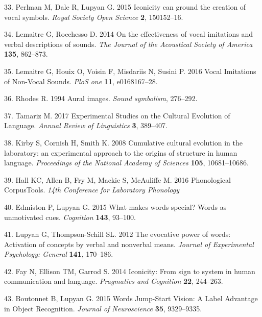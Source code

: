 \documentclass[english,floatsintext,man]{apa6}
\theoremstyle{definition}
\theoremstyle{definition}
\theoremstyle{definition}
\theoremstyle{remark}
\begin{document}
\leavevmode\hypertarget{ref-Perlman:2015ip}{}%
33. Perlman M, Dale R, Lupyan G. 2015 Iconicity can ground the creation
of vocal symbols. \emph{Royal Society Open Science} \textbf{2},
150152--16.

\leavevmode\hypertarget{ref-Lemaitre:2014kr}{}%
34. Lemaitre G, Rocchesso D. 2014 On the effectiveness of vocal
imitations and verbal descriptions of sounds. \emph{The Journal of the
Acoustical Society of America} \textbf{135}, 862--873.

\leavevmode\hypertarget{ref-Lemaitre:2016kz}{}%
35. Lemaitre G, Houix O, Voisin F, Misdariis N, Susini P. 2016 Vocal
Imitations of Non-Vocal Sounds. \emph{PloS one} \textbf{11},
e0168167--28.

\leavevmode\hypertarget{ref-Rhodes:1994au}{}%
36. Rhodes R. 1994 Aural images. \emph{Sound symbolism}, 276--292.

\leavevmode\hypertarget{ref-Tamariz:2017bd}{}%
37. Tamariz M. 2017 Experimental Studies on the Cultural Evolution of
Language. \emph{Annual Review of Linguistics} \textbf{3}, 389--407.

\leavevmode\hypertarget{ref-Kirby:2008kja}{}%
38. Kirby S, Cornish H, Smith K. 2008 Cumulative cultural evolution in
the laboratory: an experimental approach to the origins of structure in
human language. \emph{Proceedings of the National Academy of Sciences}
\textbf{105}, 10681--10686.

\leavevmode\hypertarget{ref-PCT:1.1}{}%
39. Hall KC, Allen B, Fry M, Mackie S, McAuliffe M. 2016 Phonological
CorpusTools. \emph{14th Conference for Laboratory Phonology}

\leavevmode\hypertarget{ref-Edmiston:2015he}{}%
40. Edmiston P, Lupyan G. 2015 What makes words special? Words as
unmotivated cues. \emph{Cognition} \textbf{143}, 93--100.

\leavevmode\hypertarget{ref-Lupyan:2012cp}{}%
41. Lupyan G, Thompson-Schill SL. 2012 The evocative power of words:
Activation of concepts by verbal and nonverbal means. \emph{Journal of
Experimental Psychology: General} \textbf{141}, 170--186.

\leavevmode\hypertarget{ref-Fay:2014ih}{}%
42. Fay N, Ellison TM, Garrod S. 2014 Iconicity: From sign to system in
human communication and language. \emph{Pragmatics and Cognition}
\textbf{22}, 244--263.

\leavevmode\hypertarget{ref-Boutonnet:2015fz}{}%
43. Boutonnet B, Lupyan G. 2015 Words Jump-Start Vision: A Label
Advantage in Object Recognition. \emph{Journal of Neuroscience}
\textbf{35}, 9329--9335.
\end{document}
